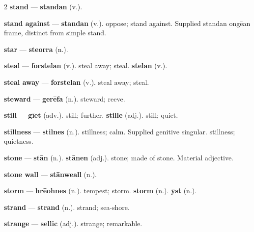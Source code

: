 \begin{multicols}{2}
\textbf{stand} — \textbf{standan} (v.).\par
\textbf{stand against} — \textbf{standan} (v.). oppose; stand against. Supplied standan ongēan frame, distinct from simple stand.\par
\textbf{star} — \textbf{steorra} (n.).\par
\textbf{steal} — \textbf{forstelan} (v.). steal away; steal. \textbf{stelan} (v.).\par
\textbf{steal away} — \textbf{forstelan} (v.). steal away; steal.\par
\textbf{steward} — \textbf{gerēfa} (n.). steward; reeve.\par
\textbf{still} — \textbf{gīet} (adv.). still; further. \textbf{stille} (adj.). still; quiet.\par
\textbf{stillness} — \textbf{stilnes} (n.). stillness; calm. Supplied genitive singular. stillness; quietness.\par
\textbf{stone} — \textbf{stān} (n.).  \textbf{stānen} (adj.). stone; made of stone. Material adjective.\par
\textbf{stone wall} — \textbf{stānweall} (n.).\par
\textbf{storm} — \textbf{hrēohnes} (n.). tempest; storm. \textbf{storm} (n.).  \textbf{ȳst} (n.).\par
\textbf{strand} — \textbf{strand} (n.). strand; sea-shore.\par
\textbf{strange} — \textbf{sellic} (adj.). strange; remarkable.\par

\end{multicols}
